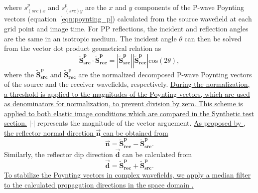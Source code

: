 \documentclass[manuscript,ulem,graphix,revised]{geophysics}
\begin{document}
where $s^{p}_{(src)x}$ and $s^{p}_{(src)y}$ are the $x$ and $y$ components of the P-wave Poynting vectors (equation~\ref{eqn:poynting_p}) calculated from the source wavefield at each grid point and image time. For PP reflections, the incident and reflection angles are the same in an isotropic medium. The incident angle $\theta$ can then be solved from the vector dot product geometrical relation \citep{du17,shabelansky17,zhu17} as
\begin{equation}
\mathbf{\tilde{S}^{p}_{src}}\cdot \mathbf{\tilde{S}^p_{rec}}=|\mathbf{\tilde{S}^{p}_{src}}||\mathbf{\tilde{S}^p_{rec}}|\mathrm{cos}(2\theta),
\label{eqn:inc_agl}
\end{equation}
where the $\mathbf{\tilde{S}^{p}_{src}}$ and $\mathbf{\tilde{S}^p_{rec}}$ are the normalized decomposed P-wave Poynting vectors of the source and the receiver wavefields, respectively. \marginpar{[7,8]} \uline{During the normalization, a threshold is applied to the magnitudes of the Poynting vectors, which are used as denominators for normalization, to prevent division by zero. This scheme is applied to both elastic image conditions which are compared in the Synthetic test section.}  $|\cdot|$ represents the magnitude of the vector arguement. \marginpar{[5]}\uline{As proposed by \mbox{\citet{du14}}, the reflector normal direction $\overrightarrow{\mathbf{n}}$ can be obtained from}
\begin{equation}
\overrightarrow{\mathbf{n}}=\mathbf{\tilde{S}^p_{rec}}-\mathbf{\tilde{S}^{p}_{src}}.
\end{equation}
Similarly, the reflector dip direction $\overrightarrow{\mathbf{d}}$ can be calculated from \marginpar{[14]}
\begin{equation}
\overrightarrow{\mathbf{d}}=\mathbf{\tilde{S}^p_{rec}}+\mathbf{\tilde{S}^{p}_{src}}.
\end{equation}
\marginpar{[7,8]}\uline{To stabilize the Poynting vectors in complex wavefields, we apply a median filter to the calculated propagation directions in the space domain \mbox{\citep{jin14}}.}
 
\end{document}
